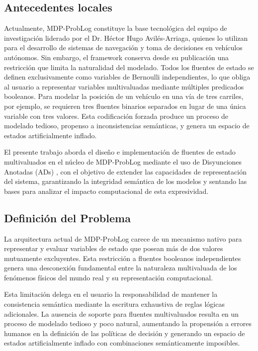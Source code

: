 \clearpage

\subsection{Antecedentes locales}
\label{sec:antecedentes}

Actualmente, MDP-ProbLog constituye la base tecnológica del equipo de investigación liderado por el Dr. Héctor Hugo Avilés-Arriaga, quienes lo utilizan para el desarrollo de sistemas de navegación y toma de decisiones en vehículos autónomos. Sin embargo, el framework conserva desde su publicación una restricción que limita la naturalidad del modelado. Todos los fluentes de estado se definen exclusivamente como variables de Bernoulli independientes, lo que obliga al usuario a representar variables multivaluadas mediante múltiples predicados booleanos. Para modelar la posición de un vehículo en una vía de tres carriles, por ejemplo, se requieren tres fluentes binarios separados en lugar de una única variable con tres valores. Esta codificación forzada produce un proceso de modelado tedioso, propenso a inconsistencias semánticas, y genera un espacio de estados artificialmente inflado.

El presente trabajo aborda el diseño e implementación de fluentes de estado multivaluados en el núcleo de MDP-ProbLog mediante el uso de Disyunciones Anotadas (ADs) \cite{vennekens2004lpads}, con el objetivo de extender las capacidades de representación del sistema, garantizando la integridad semántica de los modelos y sentando las bases para analizar el impacto computacional de esta expresividad.

\clearpage

\subsection{Definición del Problema}
\label{sec:problema}

La arquitectura actual de MDP-ProbLog carece de un mecanismo nativo para representar y evaluar variables de estado que posean más de dos valores mutuamente excluyentes. Esta restricción a fluentes booleanos independientes genera una desconexión fundamental entre la naturaleza multivaluada de los fenómenos físicos del mundo real y su representación computacional.

Esta limitación delega en el usuario la responsabilidad de mantener la consistencia semántica mediante la escritura exhaustiva de reglas lógicas adicionales. La ausencia de soporte para fluentes multivaluados resulta en un proceso de modelado tedioso y poco natural, aumentando la propensión a errores humanos en la definición de las políticas de decisión y generando un espacio de estados artificialmente inflado con combinaciones semánticamente imposibles.

